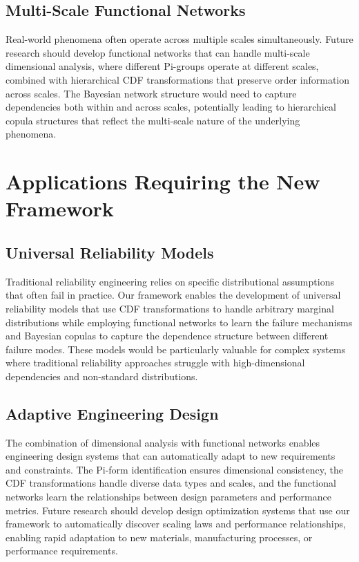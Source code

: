 \subsection{Multi-Scale Functional Networks}
Real-world phenomena often operate across multiple scales simultaneously. Future research should develop functional networks that can handle multi-scale dimensional analysis, where different Pi-groups operate at different scales, combined with hierarchical CDF transformations that preserve order information across scales.
The Bayesian network structure would need to capture dependencies both within and across scales, potentially leading to hierarchical copula structures that reflect the multi-scale nature of the underlying phenomena.

\section{Applications Requiring the New Framework}
\subsection{Universal Reliability Models}
Traditional reliability engineering relies on specific distributional assumptions that often fail in practice. Our framework enables the development of universal reliability models that use CDF transformations to handle arbitrary marginal distributions while employing functional networks to learn the failure mechanisms and Bayesian copulas to capture the dependence structure between different failure modes.
These models would be particularly valuable for complex systems where traditional reliability approaches struggle with high-dimensional dependencies and non-standard distributions.

\subsection{Adaptive Engineering Design}
The combination of dimensional analysis with functional networks enables engineering design systems that can automatically adapt to new requirements and constraints. The Pi-form identification ensures dimensional consistency, the CDF transformations handle diverse data types and scales, and the functional networks learn the relationships between design parameters and performance metrics.
Future research should develop design optimization systems that use our framework to automatically discover scaling laws and performance relationships, enabling rapid adaptation to new materials, manufacturing processes, or performance requirements.

